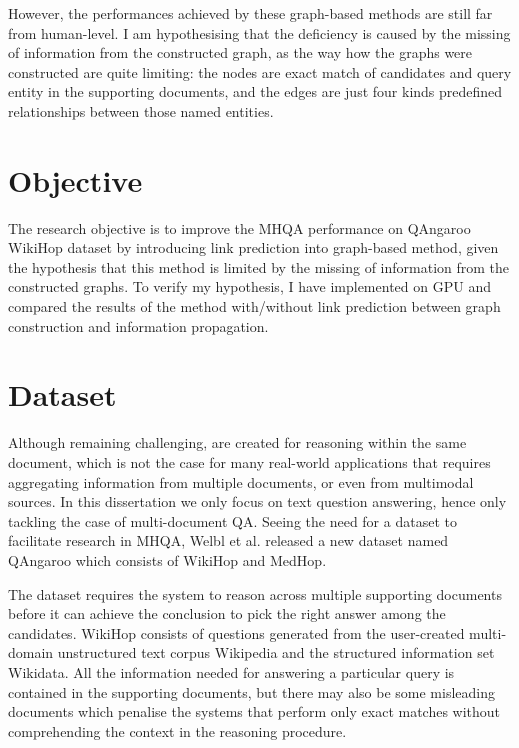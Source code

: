 \documentclass[12pt]{report}
\begin{document}
However, the performances achieved by these graph-based methods are still far from human-level. I am hypothesising that the deficiency is caused by the missing of information from the constructed graph, as the way how the graphs were constructed are quite limiting: the nodes are exact match of candidates and query entity in the supporting documents, and the edges are just four kinds predefined relationships between those named entities.
\section{Objective}
The research objective is to improve the MHQA performance on QAngaroo WikiHop dataset by introducing link prediction into graph-based method, given the hypothesis that this method is limited by the missing of information from the constructed graphs.
To verify my hypothesis, I have implemented \cite{de_cao_question_2019} on GPU and compared
the results of the method with/without link prediction between graph construction and information propagation.


\section{Dataset}

Although remaining challenging, \cite{kocisky_narrativeqa_2018, reddy_coqa:_2019, joshi_triviaqa:_2017, lai_race:_2017} are created for reasoning within the same document, which
is not the case for many real-world applications that requires aggregating information from multiple
documents, or even from multimodal sources. In this dissertation we only focus on text question answering,
hence only tackling the case of multi-document QA. Seeing the need for a dataset to facilitate research
in MHQA, Welbl et al. released a new dataset named QAngaroo \cite{welbl_constructing_2018} which consists
of WikiHop and MedHop.

The dataset requires the system to reason across multiple supporting documents
before it can achieve the conclusion to pick the right answer among the candidates. WikiHop consists
of questions generated from the user-created multi-domain unstructured text corpus Wikipedia and the
structured information set Wikidata. All the information needed for answering a particular query is contained
in the supporting documents, but there may also be some misleading documents which penalise the systems
that perform only exact matches without comprehending the context in the reasoning procedure.
\end{document}
